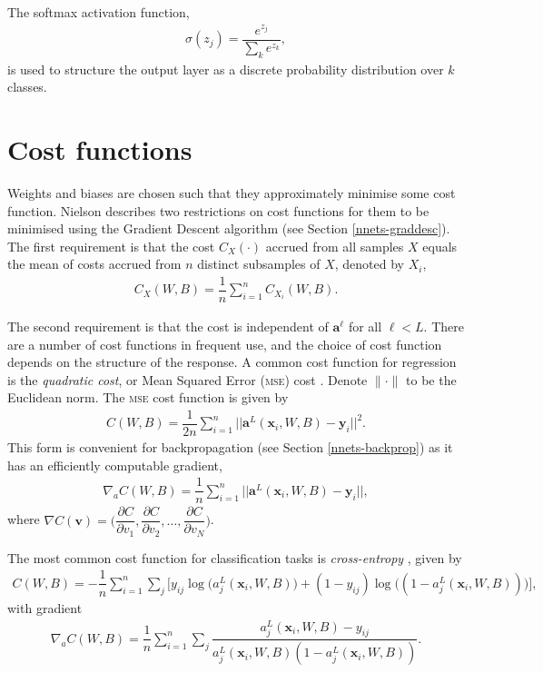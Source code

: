 The softmax activation function,
\begin{align}
	\sigma(z_j) = \dfrac{e^{z_j}}{\sum_ke^{z_k}},
\end{align}
is used to structure the output layer as a discrete probability distribution over $k$ classes.


\section{Cost functions}\label{nnets-cost}

Weights and biases are chosen such that they approximately minimise some cost function. Nielson \cite{Nielson2015} describes two restrictions on cost functions for them to be minimised using the Gradient Descent algorithm (see Section \ref{nnets-graddesc}). The first requirement is that the cost $C_X(\cdot)$ accrued from all samples $X$ equals the mean of costs accrued from $n$ distinct subsamples of $X$, denoted by $X_i$,
\begin{align}
	C_X(W, B) = \dfrac{1}{n}\sum_{i=1}^n C_{X_i}(W,B).
\end{align}

The second requirement is that the cost is independent of $\mathbf{a}^\ell$ for all $\ell < L$. There are a number of cost functions in frequent use, and the choice of cost function depends on the structure of the response. A common cost function for regression is the \textit{quadratic cost}, or Mean Squared Error (\textsc{mse}) cost \cite{Nielson2015}. Denote $\|\cdot\|$ to be the Euclidean norm. The \textsc{mse} cost function is given by
\begin{align}
	C(W,B) = \dfrac{1}{2n}\sum_{i=1}^n||\mathbf{a}^L(\mathbf{x}_i,W,B) - \mathbf{y}_i ||^2.
\end{align}
This form is convenient for backpropagation (see Section \ref{nnets-backprop}) as it has an efficiently computable gradient,
\begin{align}
	\nabla_aC(W,B) = \dfrac{1}{n}\sum_{i=1}^n||\mathbf{a}^L(\mathbf{x}_i,W,B) - \mathbf{y}_i ||,
\end{align}
where $\nabla C(\mathbf{v}) = \Big(\dfrac{\partial C}{\partial v_1}, \dfrac{\partial C}{\partial v_2},\ldots, \dfrac{\partial C}{\partial v_N}\Big)$.

The most common cost function for classification tasks is \textit{cross-entropy} \cite{Nielson2015}, given by
\begin{align}\label{nnets-cross-entropy-eq}
	C(W,B) = -\dfrac{1}{n}\sum_{i=1}^n\sum_j\big[y_{ij}\log\big(a_j^L(\mathbf{x}_i,W,B)\big) + (1 - y_{ij})\log\big( (1 - a_j^L(\mathbf{x}_i,W,B))\big)\big],
\end{align}
with gradient
\begin{align}
	\nabla_aC(W,B) = \dfrac{1}{n}\sum_{i=1}^n\sum_j\dfrac{a_j^L(\mathbf{x}_i,W,B) - y_{ij}}{a_j^L(\mathbf{x}_i,W,B)(1-a_j^L(\mathbf{x}_i,W,B))}.
\end{align}

